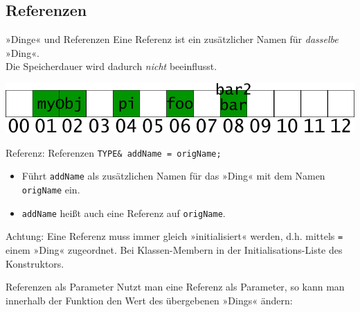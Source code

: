 \subsection{Referenzen}

\begin{frame}[fragile]{»Dinge« und Referenzen}
	Eine Referenz ist ein zusätzlicher Namen für \emph{dasselbe} »Ding«.\\
	Die Speicherdauer wird dadurch \emph{nicht} beeinflusst.
	
	{\footnotesize
	\begin{block}{}
		
	\end{block}
	}
	
	\pause
	
	\includegraphics[width=\linewidth]{images/object_refs}
	
	\pause
	
	{\footnotesize
	\begin{block}{}
		
	\end{block}
	}
\end{frame}

{
\begin{frame}[fragile]{Referenz: Referenzen}
	\verb|TYPE& addName = origName;|
	\begin{itemize}
		\item Führt \verb|addName| als zusätzlichen Namen für das »Ding« mit dem Namen \verb|origName| ein.
		\item \verb|addName| heißt auch eine Referenz auf \verb|origName|.
	\end{itemize}
	
	\vspace{2em}
	
	Achtung: Eine Referenz muss immer gleich »initialisiert« werden, d.h. mittels \verb|=| einem »Ding« zugeordnet. {\tiny Bei Klassen-Membern in der Initialisations-Liste des Konstruktors.}
\end{frame}
}

\begin{frame}[fragile]{Referenzen als Parameter}
	Nutzt man eine Referenz als Parameter, so kann man innerhalb der Funktion den Wert des übergebenen »Dings« ändern:
	
	{\footnotesize
	\begin{block}{}
		
	\end{block}
	}
	
	\pause
	
	{\footnotesize
	\begin{block}{}
		
	\end{block}
	}
\end{frame}


